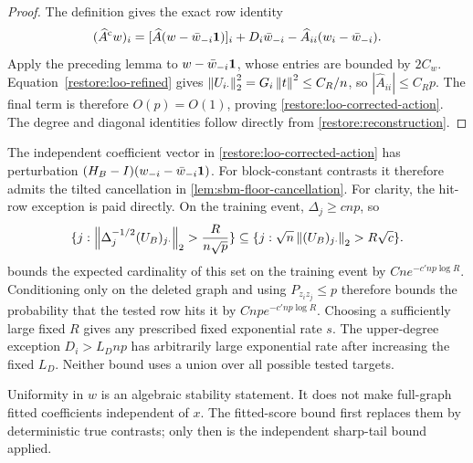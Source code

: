 \begin{proof}
The definition gives the exact row identity
\[
 (\widehat A^{\mathrm{c}} w)_i
 =[\widehat A(w-\bar w_{-i}\mathbf 1)]_i+D_i\bar w_{-i}
       -\widehat A_{ii}(w_i-\bar w_{-i}).
\]
Apply the preceding lemma to $w-\bar w_{-i}\mathbf 1$, whose entries
are bounded by $2C_w$. Equation~\eqref{restore:loo-refined} gives
$\left\lVert U_{i\cdot}\right\rVert_2^2=G_i\left\lVert t\right\rVert^2\le C_R/n$, so
$|\widehat A_{ii}|\le C_Rp$. The final term is therefore $O(p)=O(1)$,
proving \eqref{restore:loo-corrected-action}. The degree and diagonal
identities follow directly from \eqref{restore:reconstruction}.
\end{proof}

The independent coefficient vector in
\eqref{restore:loo-corrected-action} has perturbation
$(H_B-I)(w_{-i}-\bar w_{-i}\mathbf 1)$. For block-constant contrasts it
therefore admits the tilted cancellation in
\cref{lem:sbm-floor-cancellation}.
For clarity, the hit-row exception is paid directly. On the
training event, $\Delta_j\ge c {np}$, so
\[
 \{j:\left\lVert\Delta_j^{-1/2}(U_B)_{j\cdot}\right\rVert_2
                          >\frac{R}{n\sqrt p}\}
 \subseteq
 \{j:\sqrt n\left\lVert(U_B)_{j\cdot}\right\rVert_2>R\sqrt c\}.
\]
 bounds the expected cardinality of
this set on the training event by $Cn e^{-c'{np}\log R}$.
Conditioning only on the deleted graph and using $P_{z_i z_j}\le p$
therefore bounds the probability that the tested row hits it by
$C{np} e^{-c'{np}\log R}$. Choosing a sufficiently large fixed $R$
gives any prescribed fixed exponential rate $s$.
The upper-degree exception $D_i>L_D{np}$ has arbitrarily large exponential
rate after increasing the fixed $L_D$. Neither bound uses a union over
all possible tested targets.

Uniformity in $w$ is an algebraic stability statement. It does not make
full-graph fitted coefficients independent of $x$. The fitted-score
bound first replaces them by deterministic true contrasts; only then
is the independent sharp-tail bound applied.
